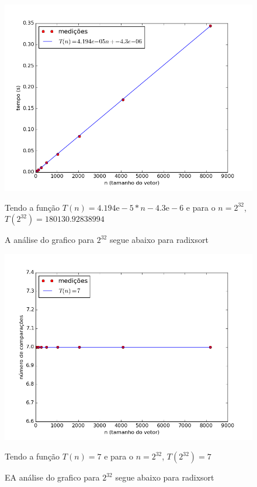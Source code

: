 \documentclass[12pt,a4paper,twoside]{report}
\begin{document}
\clearpage


\begin{figure}[ht]
\centering \includegraphics[scale=0.8]{../radixsort/imagens/radixsortQuaseCresc300.png}
\caption{A análise do grafico para $2^{32}$ segue abaixo para radixsort}

Tendo a função $T(n) = 4.194\mathrm{e}-5*n-4.3\mathrm{e}-6$ e para o $n =2^{32}$, $T(2^{32}) = 180130.92838994$
\label{fig:radixsortQuaseCresc300}
\end{figure}

\begin{figure}[ht]
\centering \includegraphics[scale=0.8]{../radixsort/imagens/radixsortQuaseCresc301.png}
\caption{EA análise do grafico para $2^{32}$ segue abaixo para radixsort}

Tendo a função $T(n) = 7$ e para o $n =2^{32}$, $T(2^{32}) = 7$
\label{fig:radixsortQuaseCresc301}
\end{figure}
\end{document}
